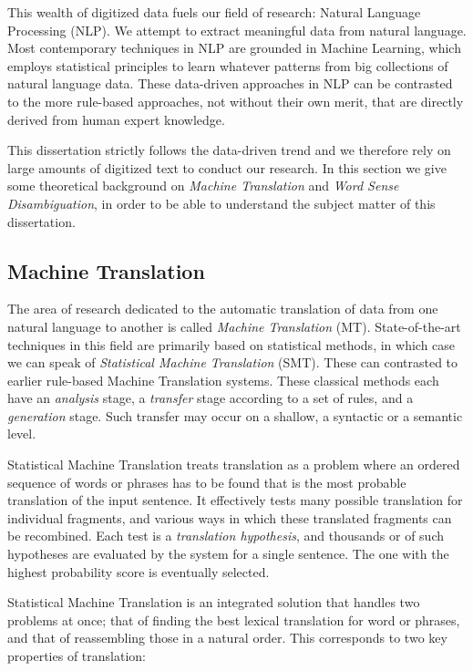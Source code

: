 This wealth of digitized data fuels our field of research: Natural Language
Processing (NLP). We attempt to extract meaningful data from natural language.
Most contemporary techniques in NLP are grounded in Machine Learning, which
employs statistical principles to learn whatever patterns from big collections
of natural language data. These data-driven approaches in NLP can be contrasted
to the more rule-based approaches, not without their own merit, that are
directly derived from human expert knowledge.

This dissertation strictly follows the data-driven trend and we therefore rely
on large amounts of digitized text to conduct our research. In this section we
give some theoretical background on \emph{Machine Translation} and \emph{Word
Sense Disambiguation}, in order to be able to understand the subject matter of
this dissertation.

\subsection{Machine Translation}

The area of research dedicated to the automatic translation of data from one
natural language to another is called \emph{Machine Translation} (MT).
State-of-the-art techniques in this field are primarily based on statistical
methods, in which case we can speak of \emph{Statistical Machine Translation}
(SMT). These can contrasted to earlier rule-based Machine Translation systems.
These classical methods each have an \emph{analysis} stage, a \emph{transfer}
stage according to a set of rules, and a \emph{generation} stage. Such transfer may occur on a shallow, a syntactic or a semantic level. 

Statistical Machine Translation treats translation as a problem where an
ordered sequence of words or phrases has to be found that is the most probable
translation of the input sentence. It effectively tests many possible
translation for individual fragments, and various ways in which these
translated fragments can be recombined. Each test is a \emph{translation
hypothesis}, and thousands or of such hypotheses are evaluated by the system
for a single sentence. The one with the highest probability score is eventually
selected.

Statistical Machine Translation is an integrated solution that handles two
problems at once; that of finding the best lexical translation for word or
phrases, and that of reassembling those in a natural order. This corresponds to
two key properties of translation:

